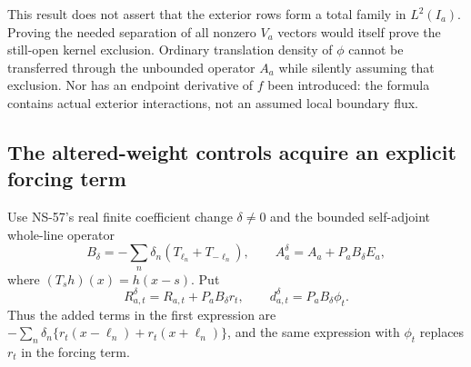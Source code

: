 \documentclass[11pt]{article}
\theoremstyle{remark}
\begin{document}
This result does not assert that the exterior rows form a total family
in $L^2(I_a)$. Proving the needed separation of all nonzero $V_a$
vectors would itself prove the still-open kernel exclusion. Ordinary
translation density of $\phi$ cannot be transferred through the
unbounded operator $A_a$ while silently assuming that exclusion.
Nor has an endpoint derivative of $f$ been introduced: the formula
contains actual exterior interactions, not an assumed local boundary flux.

\subsection*{The altered-weight controls acquire an explicit forcing term}

Use NS-57's real finite coefficient change $\delta\ne0$ and the
bounded self-adjoint whole-line operator
\[
 B_\delta=-\sum_n\delta_n(T_{\ell_n}+T_{-\ell_n}),\qquad
 A_a^\delta=A_a+P_a B_\delta E_a,
\]
where $(T_s h)(x)=h(x-s)$. Put
\[
 R_{a,t}^\delta=R_{a,t}+P_aB_\delta r_t,
 \qquad d_{a,t}^\delta=P_aB_\delta\phi_t.
\]
Thus the added terms in the first expression are
$-\sum_n\delta_n\{r_t(x-\ell_n)+r_t(x+\ell_n)\}$, and the
same expression with $\phi_t$ replaces $r_t$ in the forcing term.
\end{document}
